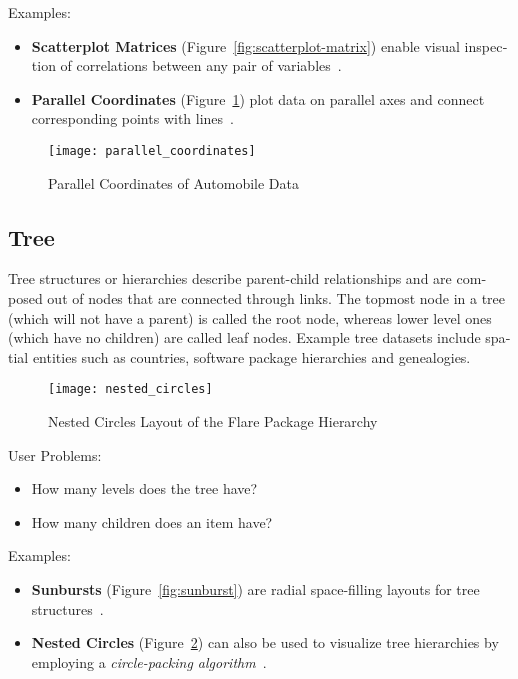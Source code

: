 \begin{english}
\SuperPar Examples:

\begin{itemize}
\item \textbf{Scatterplot Matrices} (Figure~\ref{fig:scatterplot-matrix}) enable visual inspection of correlations between any pair of variables~\cite{ScatterplotMatrix2008,VisualizationZoo:2010}.
\item \textbf{Parallel Coordinates} (Figure~\ref{fig:parallel-coordinates}) plot data on parallel axes and connect corresponding points with lines~\cite{Inselberg:1990,VisualizationZoo:2010}.
\end{itemize}

\begin{figure}
\centering
\texttt{[image: parallel\_coordinates]}
\caption{Parallel Coordinates of Automobile Data}
\label{fig:parallel-coordinates}
\end{figure}

\subsection{Tree}

Tree structures or hierarchies describe parent-child relationships and are composed out of nodes that are connected through links. The topmost node in a tree (which will not have a parent) is called the root node, whereas lower level ones (which have no children) are called leaf nodes. Example tree datasets include spatial entities such as countries, software package hierarchies and genealogies.

\begin{figure}
\centering
\texttt{[image: nested\_circles]}
\caption{Nested Circles Layout of the Flare Package Hierarchy}
\label{fig:nested_circles}
\end{figure}

\pagebreak
\SuperPar User Problems:

\begin{itemize}
\item How many levels does the tree have?
\item How many children does an item have?
\end{itemize}

\SuperPar Examples:

\begin{itemize}
\item \textbf{Sunbursts} (Figure~\ref{fig:sunburst}) are radial space-filling layouts for tree structures~\cite{Stasko:2000,VisualizationZoo:2010}.
\item \textbf{Nested Circles} (Figure~\ref{fig:nested_circles}) can also be used to visualize tree hierarchies by employing a \emph{circle-packing algorithm}~\cite{Wang:2006,VisualizationZoo:2010}.
\end{itemize}


\end{english}
